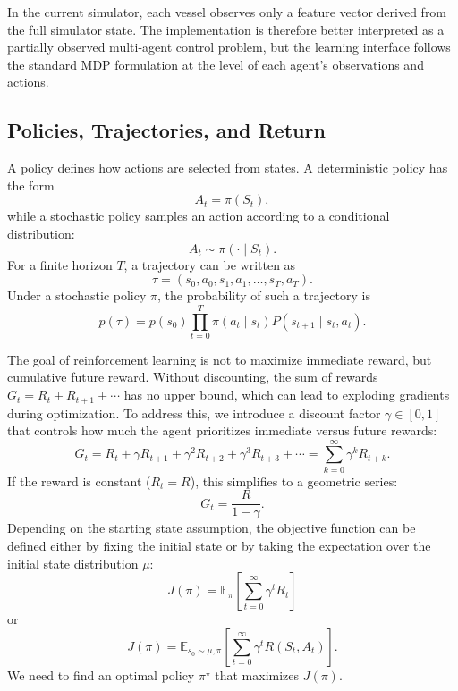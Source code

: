 \documentclass{article}
\begin{document}
In the current simulator, each vessel observes only a feature vector derived from the full simulator state. The implementation is therefore better interpreted as a partially observed multi-agent control problem, but the learning interface follows the standard MDP formulation at the level of each agent's observations and actions.

\subsection{Policies, Trajectories, and Return}
A policy defines how actions are selected from states. A deterministic policy has the form
\begin{equation}
    A_t = \pi(S_t),
\end{equation}
while a stochastic policy samples an action according to a conditional distribution:
\begin{equation}
    A_t \sim \pi(\cdot \mid S_t).
\end{equation}
For a finite horizon $T$, a trajectory can be written as
\begin{equation}
    \tau = (s_0,a_0,s_1,a_1,\ldots,s_T,a_T).
\end{equation}
Under a stochastic policy $\pi$, the probability of such a trajectory is
\begin{equation}
    p(\tau) = p(s_0)\prod_{t=0}^{T}\pi(a_t \mid s_t)P(s_{t+1}\mid s_t,a_t).
\end{equation}

The goal of reinforcement learning is not to maximize immediate reward, but cumulative future reward. Without discounting, the sum of rewards $G_t = R_t + R_{t+1} + \cdots$ has no upper bound, which can lead to exploding gradients during optimization. To address this, we introduce a discount factor $\gamma \in [0,1]$ that controls how much the agent prioritizes immediate versus future rewards:
\begin{equation}
    G_t = R_t + \gamma R_{t+1} + \gamma^2 R_{t+2} + \gamma^3 R_{t+3} + \cdots
    = \sum_{k=0}^{\infty}\gamma^k R_{t+k}.
\end{equation}
If the reward is constant ($R_t = R$), this simplifies to a geometric series:
\begin{equation}
    G_t = \frac{R}{1-\gamma}.
\end{equation}
Depending on the starting state assumption, the objective function can be defined either by fixing the initial state or by taking the expectation over the initial state distribution $\mu$:
\begin{equation}
    J(\pi) = \mathbb{E}_{\pi}\left[\sum_{t=0}^{\infty}\gamma^t R_t\right]
\end{equation}
or
\begin{equation}
    J(\pi) =
    \mathbb{E}_{s_0 \sim \mu,\pi}
    \left[
        \sum_{t=0}^{\infty}\gamma^t R(S_t,A_t)
    \right].
\end{equation}
We need to find an optimal policy $\pi^\star$ that maximizes $J(\pi)$.
\end{document}
